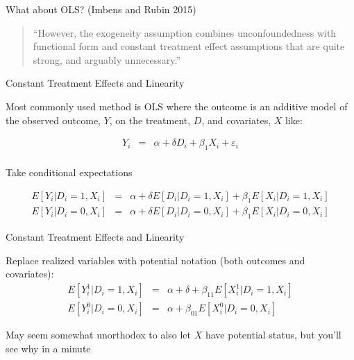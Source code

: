 \documentclass{beamer}
\begin{document}
\begin{frame}{What about OLS?  (Imbens and Rubin 2015)}

\begin{quote}
``However, the exogeneity assumption combines unconfoundedness with functional form and constant treatment effect assumptions that are quite strong, and arguably unnecessary.''
\end{quote}

\end{frame}




\begin{frame}{Constant Treatment Effects and Linearity}

Most commonly used method is OLS where the outcome is an additive model of the observed outcome, $Y$, on the treatment, $D$, and covariates, $X$ like:

\begin{eqnarray*}
Y_{i} &=& \alpha + \delta D_i + \beta_1 X_i +  \varepsilon_i \\
\end{eqnarray*}

Take conditional expectations 

\begin{eqnarray*}
E[Y_i | D_i = 1, X_i] &=& \alpha + \delta E[D_i | D_i=1, X_i] + \beta_1 E[X_i | D_i=1, X_i] \\
E[Y_i | D_i = 0, X_i] &=& \alpha + \delta E[D_i | D_i=0, X_i] + \beta_1 E[X_i | D_i=0, X_i] 
\end{eqnarray*}

\end{frame}

\begin{frame}{Constant Treatment Effects and Linearity}

Replace realized variables with potential notation (both outcomes and covariates):
\begin{eqnarray*}
E[Y^1_i | D_i = 1,X_i] &=& \alpha + \delta + \beta_{11} E[X^1_i | D_i=1, X_i] \\
E[Y^0_i | D_i = 0,X_i] &=& \alpha + \beta_{01} E[X^0_i | D_i=0, X_i] 
\end{eqnarray*}

\bigskip

May seem somewhat unorthodox to also let $X$ have potential status, but you'll see why in a minute


\end{frame}
\end{document}
